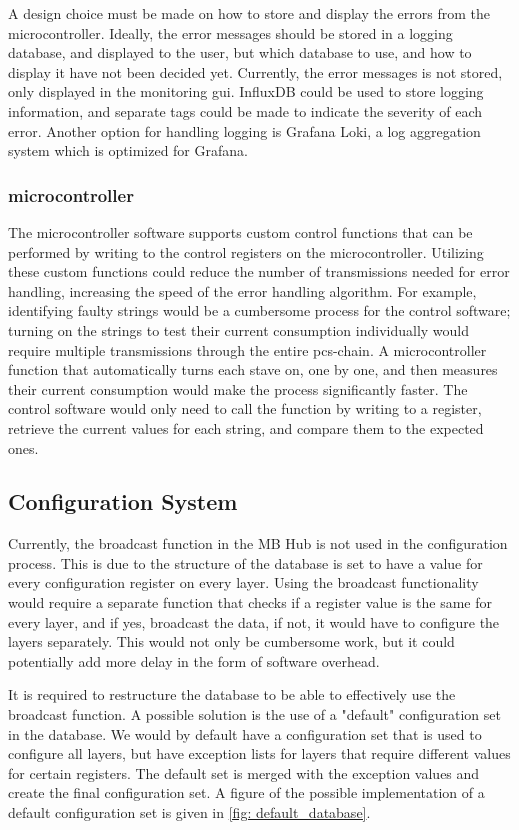 \documentclass[main.tex]{subfiles}
\begin{document}
A design choice must be made on how to store and display the errors from the microcontroller. Ideally, the error messages should be stored in a logging database, and displayed to the user, but which database to use, and how to display it have not been decided yet. Currently, the error messages is not stored, only displayed in the monitoring \gls{gui}. InfluxDB could be used to store logging information, and separate tags could be made to indicate the severity of each error. Another option for handling logging is Grafana Loki, a log aggregation system which is optimized for Grafana. 

\subsubsection{microcontroller}
The microcontroller software supports custom control functions that can be performed by writing to the control registers on the microcontroller. Utilizing these custom functions could reduce the number of transmissions needed for error handling, increasing the speed of the error handling algorithm. For example, identifying faulty strings would be a cumbersome process for the control software; turning on the strings to test their current consumption individually would require multiple transmissions through the entire \gls{pcs}-chain. A microcontroller function that automatically turns each stave on, one by one, and then measures their current consumption would make the process significantly faster. The control software would only need to call the function by writing to a register, retrieve the current values for each string, and compare them to the expected ones.

\subsection{Configuration System}

Currently, the broadcast function in the MB Hub is not used in the configuration process. This is due to the structure of the database is set to have a value for every configuration register on every layer. Using the broadcast functionality would require a separate function that checks if a register value is the same for every layer, and if yes, broadcast the data, if not, it would have to configure the layers separately. This would not only be cumbersome work, but it could potentially add more delay in the form of software overhead.

It is required to restructure the database to be able to effectively use the broadcast function. A possible solution is the use of a "default" configuration set in the database. We would by default have a configuration set that is used to configure all layers, but have exception lists for layers that require different values for certain registers. The default set is merged with the exception values and create the final configuration set. A figure of the possible implementation of a default configuration set is given in \autoref{fig: default_database}.
\end{document}

